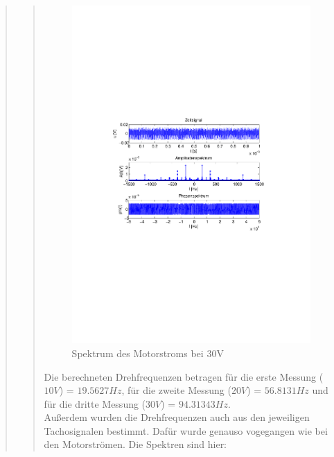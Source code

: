 \begin{quote}
\begin{quote}
               
               \begin{figure}[H]
                    \centering
                        \includegraphics[scale=0.63, trim = 1cm 9cm 1.5cm 8cm,
                        clip]{./Bilder/Termin7/ampl_spektrum_messung3}
                        \caption{Spektrum des Motorstroms bei 30V}
               \end{figure}
        
        Die berechneten Drehfrequenzen betragen für die erste Messung ($10V$) =
        $19.5627 Hz$, für die zweite Messung ($20V$) = $56.8131 Hz$ und für die
        dritte Messung ($30V$) = $94.31343 Hz$.\\
        
        Außerdem wurden die Drehfrequenzen auch aus den jeweiligen Tachosignalen
        bestimmt. Dafür wurde genauso vogegangen wie bei den Motorströmen. Die
        Spektren sind hier:
           

\end{quote}
\end{quote}
